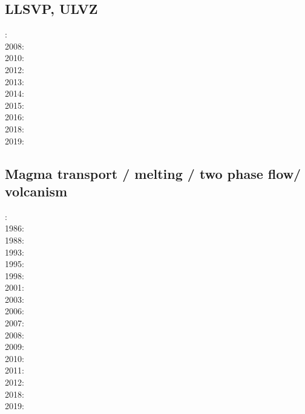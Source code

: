 \cite{davi84}\cite{hage84}
\cite{davi86}
\cite{zhgu92}
\cite{zhch93}\cite{rirl93}
\cite{mogu96}
\cite{cava98}
\cite{king09}
\cite{hibi12}

\subsection*{LLSVP, ULVZ}

: \cite{heta07}\\
2008: \cite{gamc08}\\
2010: \cite{stto10}\\
2012: \cite{stto12}\cite{dagd12}\cite{dect12}\\
2013: \cite{limc13}\cite{bogs13a}\\
2014: \cite{budt14}\cite{lidt14}\\
2015: \cite{musd15}\cite{hafg15}\cite{mczh05a}\\
2016: \cite{dost16}\\
2018: \cite{daga18}\\
2019: \cite{hebo19}

\subsection*{Magma transport / melting / two phase flow/ volcanism}

: \cite{scst84}\cite{mcke84}\\
1986: \cite{scst86}\\
1988: \cite{scot88}\\
1993: \cite{spie93}\\
1995: \cite{bisc95}\\
1998: \cite{rabg98}\\
2001: \cite{bers01}\\
2003: \cite{beri03}\\
2006: \cite{omma06}\\
2007: \cite{srrb07}\\
2008: \cite{hets08}\cite{hest08}\\
2009: \cite{bavi09}\\
2010: \cite{baiv10}\\
2011: \cite{baiv11}\cite{zhgy11}\\
2012: \cite{yatd12}\\
2018: \cite{lorg18}\\
2019: \cite{dagg19}


